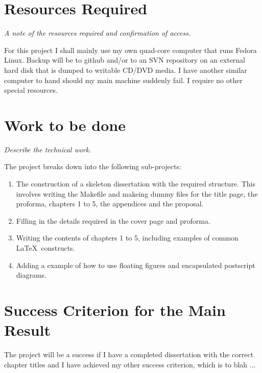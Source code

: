 \section*{Resources Required}

{\em A note of the resources required and confirmation of access.}

For this project I shall mainly use my own quad-core computer that runs Fedora Linux. Backup
will be to github and/or to an SVN repository on an external hard disk that is dumped to writable CD/DVD media.
I have another similar computer to hand should my main machine suddenly fail.
I require no other special resources.

\section*{Work to be done}

{\em Describe the technical work.}

The project breaks down into the following sub-projects:

\begin{enumerate}

\item The construction of a skeleton dissertation with the required 
structure. This involves writing the Makefile and makeing dummy files
for the title page, the proforma, chapters 1 to 5, the appendices and
the proposal.

\item Filling in the details required in the cover page and proforma.

\item Writing the contents of chapters 1 to 5, including examples
of common \LaTeX\ constructs.

\item Adding a example of how to use floating figures and encapsulated
postscript diagrams.

\end{enumerate}

\section*{Success Criterion for the Main Result}


The project will be a success if I have a completed dissertation with the correct chapter
titles and I have achieved my other success criterion, which is to blah ...



